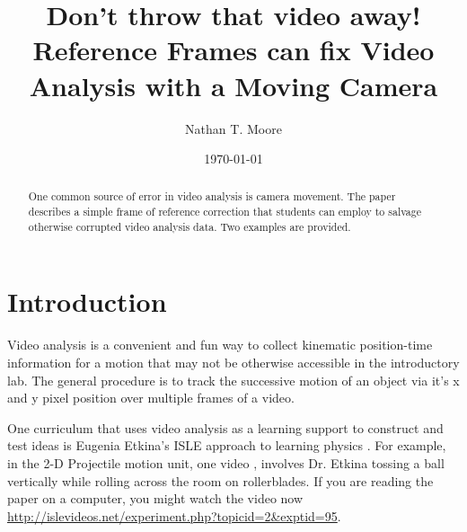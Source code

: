 \documentclass[prb,twocolumn]{revtex4-2}
\begin{document}
\title{Don't throw that video away!\\ Reference Frames can fix Video Analysis with a Moving Camera}

\author{Nathan T. Moore}

\date{\today}

\begin{abstract}
One common source of error in video analysis is camera movement.  The paper describes a simple frame of reference correction that students can employ to salvage otherwise corrupted video analysis data.  Two examples are provided. 
\end{abstract}

\maketitle %


\section{Introduction} 
Video analysis is a convenient and fun way to collect kinematic position-time information for a motion that may not be otherwise accessible in the introductory lab.  The general procedure is to track the successive motion of an object via it's x and y pixel position over multiple frames of a video.  

One curriculum that uses video analysis as a learning support to construct and test ideas is Eugenia Etkina's ISLE approach to learning physics \cite{ISLE_overview}. 
For example, in the 2-D Projectile motion unit, one video \cite{ISLE_ball_video_source}, involves Dr. Etkina tossing a ball vertically while rolling across the room on rollerblades. If you are reading the paper on a computer, you might watch the video now \url{http://islevideos.net/experiment.php?topicid=2&exptid=95}.   
\end{document}
